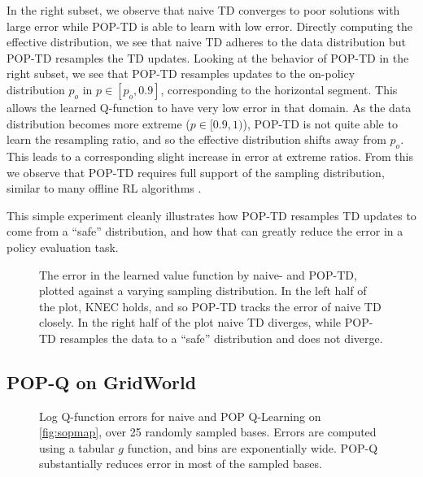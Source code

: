 In the right subset, we observe that naive TD converges to poor solutions with large error while POP-TD is able to learn with low error.
Directly computing the effective distribution, we see that naive TD adheres to the data distribution but POP-TD resamples the TD updates.
Looking at the behavior of POP-TD in the right subset, we see that POP-TD resamples updates to the on-policy distribution $p_o$ in $p\in[p_o,0.9]$, corresponding to the horizontal segment. This allows the learned Q-function to have very low error in that domain. As the data distribution becomes more extreme ($p\in [0.9, 1)$), POP-TD is not quite able to learn the resampling ratio, and so the effective distribution shifts away from $p_o$. This leads to a corresponding slight increase in error at extreme ratios. From this we observe that POP-TD requires full support of the sampling distribution, similar to many offline RL algorithms \cite{kumar2020cql,shi2022pessimistic}.

This simple experiment cleanly illustrates how POP-TD resamples TD updates to come from a ``safe'' distribution, and how that can greatly reduce the error in a policy evaluation task.

\label{sec:threestateexp}
\begin{figure}[t]
  \centering
  
  \caption{The error in the learned value function by naive- and POP-TD, plotted against a varying sampling distribution. In the left half of the plot, KNEC holds, and so POP-TD tracks the error of naive TD closely. In the right half of the plot naive TD diverges, while POP-TD resamples the data to a ``safe'' distribution and does not diverge. }
  \label{fig:threestate}
\end{figure}


\subsection{POP-Q on GridWorld}

\label{sec:expsimpleoffpolicy}
\begin{figure}[t]
  \centering
  
  \caption{Log Q-function errors for naive and POP Q-Learning on \cref{fig:sopmap}, over 25 randomly sampled bases. Errors are computed using a tabular $g$ function, and bins are exponentially wide. POP-Q substantially reduces error in most of the sampled bases. }
  \label{fig:soperr}
\end{figure}


